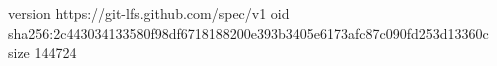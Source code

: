 version https://git-lfs.github.com/spec/v1
oid sha256:2c443034133580f98df6718188200e393b3405e6173afc87c090fd253d13360c
size 144724
